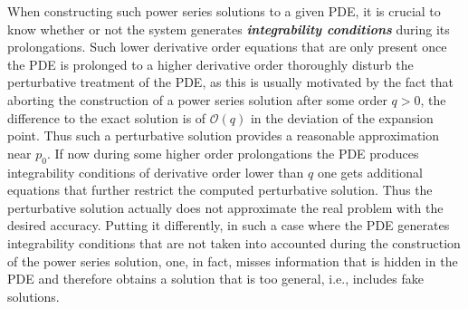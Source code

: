 \documentclass[%
 reprint,
nofootinbib,
 amsmath,amssymb,
 aps,
 prd,
floatfix,
]{revtex4-2}
\begin{document}
When constructing such power series solutions to a given PDE, it is crucial to know whether or not the system generates \textit{\textbf{integrability conditions}} during its prolongations. Such lower derivative order equations that are only present once the PDE is prolonged to a higher derivative order thoroughly disturb the perturbative treatment of the PDE, as this is usually motivated by the fact that aborting the construction of a power series solution
after some order $q>0$, the difference to the exact solution is of $\mathcal{O}(q)$ in the deviation of the expansion point. Thus such a perturbative solution provides a reasonable approximation near $p_0$. 
If now during some higher order prolongations the PDE produces integrability conditions of derivative order lower than $q$ one gets additional equations that further restrict the computed perturbative solution. 
Thus the perturbative solution actually does not approximate the real problem with the desired accuracy. Putting it differently, in such a case where the PDE generates integrability conditions that are not taken into accounted during the construction of the power series solution, one, in fact, misses information that is hidden in the PDE and therefore obtains a solution that is too general, i.e., includes fake solutions. 
\end{document}
